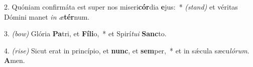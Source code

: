 2. Quóniam confirmáta est super nos miseri\textbf{cór}dia \textbf{e}jus:~* {\color{red}\textit{(stand)}} et véritas Dómini manet \textit{in} \textit{æ}\textbf{tér}num.

3. {\color{red}\textit{(bow)}} Glória \textbf{Pa}tri, et \textbf{Fí}\textbf{li}o,~* et Spirí\textit{tu}\textit{i} \textbf{Sanc}to.

4. {\color{red}\textit{(rise)}} Sicut erat in princípio, et \textbf{nunc}, et \textbf{sem}per,~* et in sǽcula sæcu\textit{ló}\textit{rum}. \textbf{A}men.